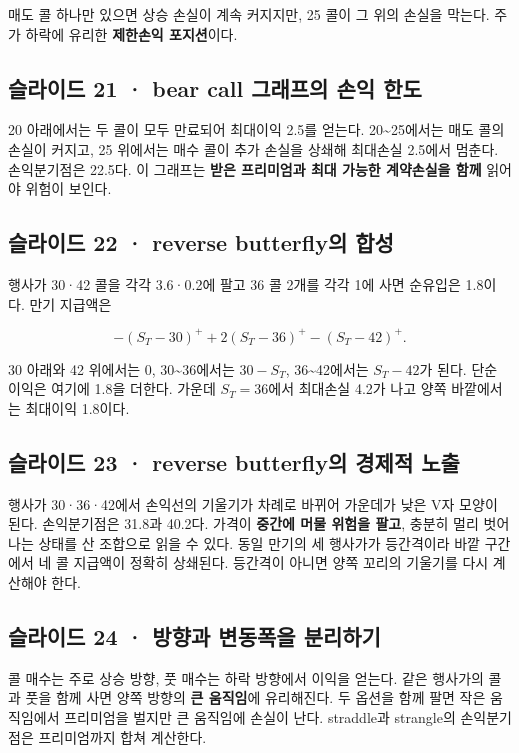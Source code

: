 \documentclass[11pt,a4paper]{article}
\begin{document}
매도 콜 하나만 있으면 상승 손실이 계속 커지지만, 25 콜이 그 위의 손실을 막는다. 주가 하락에 유리한 \textbf{제한손익 포지션}이다.\par

\subsection{슬라이드 21 · bear call 그래프의 손익 한도}
20 아래에서는 두 콜이 모두 만료되어 최대이익 2.5를 얻는다. 20\~{}25에서는 매도 콜의 손실이 커지고, 25 위에서는 매수 콜이 추가 손실을 상쇄해 최대손실 2.5에서 멈춘다. 손익분기점은 22.5다. 이 그래프는 \textbf{받은 프리미엄과 최대 가능한 계약손실을 함께} 읽어야 위험이 보인다.\par

\subsection{슬라이드 22 · reverse butterfly의 합성}
행사가 30·42 콜을 각각 3.6·0.2에 팔고 36 콜 2개를 각각 1에 사면 순유입은 1.8이다. 만기 지급액은\par

\[
-(S_T-30)^++2(S_T-36)^+-(S_T-42)^+.
\]

30 아래와 42 위에서는 0, 30\~{}36에서는 $30-S_T$, 36\~{}42에서는 $S_T-42$가 된다. 단순 이익은 여기에 1.8을 더한다. 가운데 $S_T=36$에서 최대손실 4.2가 나고 양쪽 바깥에서는 최대이익 1.8이다.\par

\subsection{슬라이드 23 · reverse butterfly의 경제적 노출}
행사가 30·36·42에서 손익선의 기울기가 차례로 바뀌어 가운데가 낮은 V자 모양이 된다. 손익분기점은 31.8과 40.2다. 가격이 \textbf{중간에 머물 위험을 팔고}, 충분히 멀리 벗어나는 상태를 산 조합으로 읽을 수 있다. 동일 만기의 세 행사가가 등간격이라 바깥 구간에서 네 콜 지급액이 정확히 상쇄된다. 등간격이 아니면 양쪽 꼬리의 기울기를 다시 계산해야 한다.\par

\subsection{슬라이드 24 · 방향과 변동폭을 분리하기}
콜 매수는 주로 상승 방향, 풋 매수는 하락 방향에서 이익을 얻는다. 같은 행사가의 콜과 풋을 함께 사면 양쪽 방향의 \textbf{큰 움직임}에 유리해진다. 두 옵션을 함께 팔면 작은 움직임에서 프리미엄을 벌지만 큰 움직임에 손실이 난다. straddle과 strangle의 손익분기점은 프리미엄까지 합쳐 계산한다.\par
\end{document}
